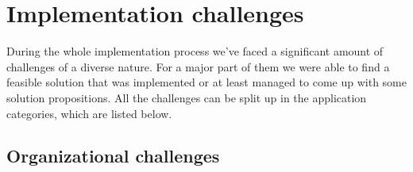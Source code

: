 \section{Implementation challenges} \label{chap:challenges}

During the whole implementation process we've faced a significant amount of challenges of a diverse nature. For a major part of them we were able to find a feasible solution that was implemented or at least managed to come up with some solution propositions. All the challenges can be split up in the application categories, which are listed below.

\subsection{Organizational challenges}

